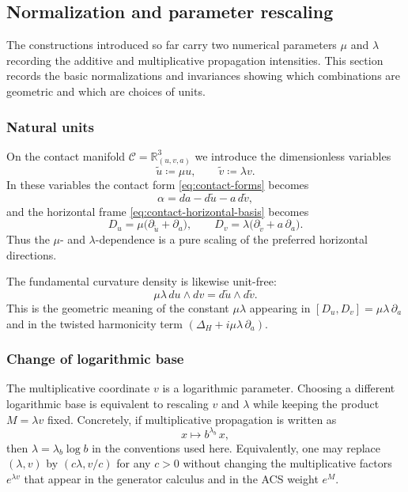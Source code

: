
\subsection{Normalization and parameter rescaling}\label{subsec:inv-normalization}

The constructions introduced so far carry two numerical parameters $\mu$ and $\lambda$ recording the additive and multiplicative propagation intensities. This section records the basic normalizations and invariances showing which combinations are geometric and which are choices of units.

\subsubsection*{Natural units}
On the contact manifold $\mathcal{C}=\mathbb{R}^3_{(u,v,a)}$ we introduce the dimensionless variables
\begin{equation}\label{eq:inv-natural-units}
\tilde u\coloneqq \mu u,
\qquad
\tilde v\coloneqq \lambda v.
\end{equation}
In these variables the contact form \eqref{eq:contact-forms} becomes
\begin{equation}\label{eq:inv-alpha-natural}
\alpha=da-d\tilde u-a\,d\tilde v,
\end{equation}
and the horizontal frame \eqref{eq:contact-horizontal-basis} becomes
\begin{equation}\label{eq:inv-horizontal-natural}
D_u=\mu\bigl(\partial_{\tilde u}+\partial_a\bigr),
\qquad
D_v=\lambda\bigl(\partial_{\tilde v}+a\,\partial_a\bigr).
\end{equation}
Thus the $\mu$- and $\lambda$-dependence is a pure scaling of the preferred horizontal directions.

The fundamental curvature density is likewise unit-free:
\begin{equation}\label{eq:inv-curvature-density}
\mu\lambda\,du\wedge dv=d\tilde u\wedge d\tilde v.
\end{equation}
This is the geometric meaning of the constant $\mu\lambda$ appearing in $[D_u,D_v]=\mu\lambda\,\partial_a$ and in the twisted harmonicity term $(\Delta_H+i\mu\lambda\,\partial_a)$.

\subsubsection*{Change of logarithmic base}
The multiplicative coordinate $v$ is a logarithmic parameter. Choosing a different logarithmic base is equivalent to rescaling $v$ and $\lambda$ while keeping the product $M=\lambda v$ fixed. Concretely, if multiplicative propagation is written as
\[
x\mapsto b^{\lambda_b}\,x,
\]
then $\lambda=\lambda_b\log b$ in the conventions used here. Equivalently, one may replace $(\lambda,v)$ by $(c\lambda,v/c)$ for any $c>0$ without changing the multiplicative factors $e^{\lambda v}$ that appear in the generator calculus and in the ACS weight $e^M$.

